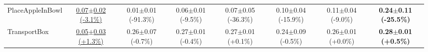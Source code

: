 \begin{table}[htbp]
\begin{adjustbox}{max width=\textwidth}
\begin{tabular}{l*{7}{c}}
PlaceAppleInBowl & \underline{0.07$\pm$0.02 \scriptsize{(-3.1\%)}} & 0.01$\pm$0.01 \scriptsize{(-91.3\%)} & 0.06$\pm$0.01 \scriptsize{(-9.5\%)} & 0.07$\pm$0.05 \scriptsize{(-36.3\%)} & 0.10$\pm$0.04 \scriptsize{(-15.9\%)} & 0.11$\pm$0.04 \scriptsize{(-9.0\%)} & \textbf{0.24$\pm$0.11 \scriptsize{(-25.5\%)}} \\
TransportBox & \underline{0.05$\pm$0.03 \scriptsize{(+1.3\%)}} & 0.26$\pm$0.07 \scriptsize{(-0.7\%)} & 0.27$\pm$0.01 \scriptsize{(-0.4\%)} & 0.27$\pm$0.01 \scriptsize{(+0.1\%)} & 0.24$\pm$0.09 \scriptsize{(-0.5\%)} & 0.26$\pm$0.01 \scriptsize{(+0.0\%)} & \textbf{0.28$\pm$0.01 \scriptsize{(+0.5\%)}} \\
\bottomrule
\end{tabular}
\end{adjustbox}
\end{table}

